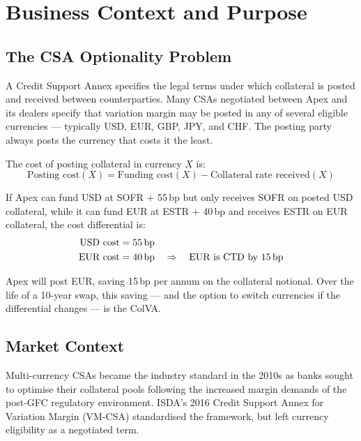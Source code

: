 \documentclass[11pt,a4paper]{article}
\begin{document}
\section{Business Context and Purpose}

\subsection{The CSA Optionality Problem}

A Credit Support Annex specifies the legal terms under which collateral is posted and received
between counterparties. Many CSAs negotiated between Apex and its dealers specify that variation
margin may be posted in any of several eligible currencies --- typically USD, EUR, GBP, JPY, and
CHF. The posting party always posts the currency that costs it the least.

The cost of posting collateral in currency $X$ is:
\begin{equation}
\text{Posting cost}(X) = \text{Funding cost}(X) - \text{Collateral rate received}(X)
\tag{1}
\end{equation}

If Apex can fund USD at SOFR + 55\,bp but only receives SOFR on posted USD collateral, while it
can fund EUR at ESTR + 40\,bp and receives ESTR on EUR collateral, the cost differential is:
\begin{align*}
\text{USD cost} &= 55\,\mathrm{bp} \\
\text{EUR cost} &= 40\,\mathrm{bp} \quad\Rightarrow\quad \text{EUR is CTD by 15\,bp}
\end{align*}

Apex will post EUR, saving 15\,bp per annum on the collateral notional. Over the life of a
10-year swap, this saving --- and the option to switch currencies if the differential changes ---
is the ColVA.

\subsection{Market Context}

Multi-currency CSAs became the industry standard in the 2010s as banks sought to optimise their
collateral pools following the increased margin demands of the post-GFC regulatory environment.
ISDA's 2016 Credit Support Annex for Variation Margin (VM-CSA) standardised the framework, but
left currency eligibility as a negotiated term.
\end{document}
